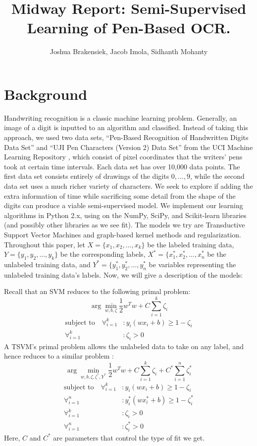 \documentclass[11pt]{article}
\title{Midway Report: Semi-Supervised Learning of Pen-Based OCR.}
\author{Joshua Brakensiek, Jacob Imola, Sidhanth Mohanty}
\begin{document}
\maketitle

\newcommand{\Seq}{\operatorname{Seq}}
\section{Background}
Handwriting recognition is a classic machine learning problem. Generally, an image of a digit is inputted to an algorithm and classified. Instead of taking this approach, we used two data sets,  ``Pen-Based Recognition of Handwritten Digits Data Set'' \cite{Alpaydin:1998} and  ``UJI Pen Characters (Version 2) Data Set'' \cite{Llorens:2008} from the UCI Machine Learning Repository \cite{Lichman:2013}, which consist of pixel coordinates that the writers' pens took at certain time intervals.  Each data set has over 10,000 data points. The first data set consists entirely of drawings of the digits $0, \hdots, 9$, while the second data set uses a much richer variety of characters. We seek to explore if adding the extra information of time while sacrificing some detail from the shape of the digits can produce a viable semi-supervised model.  We implement our learning algorithms in Python 2.x, using on the NumPy, SciPy, and Scikit-learn libraries (and possibly other libraries as we see fit). The models we try are Transductive Support Vector Machines and graph-based kernel methods and regularization. Throughout this paper, let $X = \{x_1, x_2, \ldots, x_k\}$ be the labeled training data, $Y = \{y_1, y_2, \ldots, y_k\}$ be the corresponding labels, $X^* = \{x^*_1, x^*_2, \ldots, x^*_n$ be the unlabeled training data, and $Y^* = \{y^*_1, y^*_2, \ldots, y^*_n$ be variables representing the unlabeled training data's labels. Now, we will give a description of the models: \par
Recall that an SVM reduces to the following primal problem:
\[
\arg\min_{w, b, \zeta} \frac{1}{2}w^Tw+C\sum_{i=1}^k\zeta_i
\]
\begin{align*}
\textrm{subject to}\quad \forall_{i=1}^k&: y_i(wx_i+b)\geq 1-\zeta_i \\
\forall_{i=1}^k&: \zeta_i>0
\end{align*}
A TSVM's primal problem allows the unlabeled data to take on any label, and hence reduces to a similar problem \cite{Joachims:1999}:
\begin{equation}\label{eq:1}
\arg\min_{w, b, \zeta, \zeta^*, Y^*} \frac{1}{2}w^Tw+C\sum_{i=1}^k\zeta_i+C^*\sum_{i=1}^n\zeta^*_i
\end{equation}
\begin{align*}
\textrm{subject to}\quad \forall_{i=1}^k&: y_i(wx_i+b)\geq 1-\zeta_i \\
\forall_{i=1}^n&: y^*_i(wx^*_i+b)\geq 1-\zeta^*_i \\
\forall_{i=1}^k&: \zeta_i>0 \\
\forall_{i=1}^n&: \zeta^*_i>0
\end{align*}
Here, $C$ and $C^*$ are parameters that control the type of fit we get.
\end{document}
